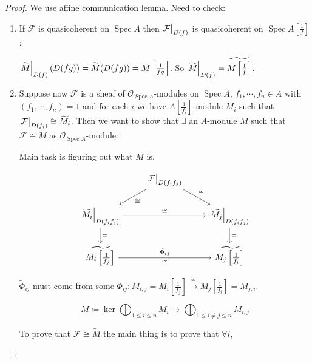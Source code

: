 \documentclass{article}
\theoremstyle{definition}
\begin{document}
    \begin{proof}
        We use affine communication lemma. Need to check:

        \begin{enumerate}[label=\arabic*)]
            \item If \(\mathcal{F}\) is quasicoherent on \(\operatorname{Spec} A\) then \(\eval{\mathcal{F}}_{D(f)}\) is quasicoherent on \(\operatorname{Spec} A\left[ \frac{1}{f} \right]\):
            
            \(\eval{\widetilde{M}}_{D(f)} (D(fg)) = \widetilde{M} (D(fg)) = M \left[ \frac{1}{fg} \right]\). So \(\eval{\widetilde{M}}_{D(f)} = \widetilde{M \left[ \frac{1}{f} \right] }\).   

            \item Suppose now \(\mathcal{F}\) is a sheaf of \(\mathcal{O}_{\operatorname{Spec} A}\)-modules on \(\operatorname{Spec} A\), \(f_1, \cdots , f_n \in A\) with \((f_1, \cdots , f_n) = 1\) and for each \(i\) we have \(A \left[ \frac{1}{f_i} \right] \)-module \(M_i\) such that \(\eval{\mathcal{F}}_{D(f_i)} \cong \widetilde{M}_i\). Then we want to show that \(\exists\) an \(A\)-module \(M\) such that \(\mathcal{F} \cong \widetilde{M}\) as \(\mathcal{O}_{\operatorname{Spec} A}\)-module:
            
            Main task is figuring out what \(M\) is.

            \[
                \begin{tikzcd}
                    & \eval{\mathcal{F}}_{D(f_i f_j)} \ar[ld, "\cong"] \ar[rd,"\cong"] \\ \eval{\widetilde{M}_i}_{D(f_i f_j)} \ar[rr,"\cong"] \ar[d,"="] & & \eval{\widetilde{M}_j}_{D(f_i f_j)} \ar[d,"="] \\
                    \widetilde{M_i \left[ \frac{1}{f_j} \right]} \ar[rr, "\widetilde{\Phi}_{ij}", "\cong"'] & & \widetilde{M_j \left[ \frac{1}{f_i} \right]} 
                \end{tikzcd}
            \]

            \(\widetilde{\Phi}_{ij}\) must come from some \(\Phi_{ij}: M_{i,j} = M_i \left[ \frac{1}{f_j} \right] \xrightarrow{\cong} M_j \left[ \frac{1}{f_i} \right] = M_{j,i}\). 
            
            \[
                M \coloneqq \ker \bigoplus_{1 \leq i \leq n} M_i \to \bigoplus_{1 \leq i \neq j \leq n} M_{i,j} 
            \]

            To prove that \(\mathcal{F} \cong \widetilde{M} \) the main thing is to prove that \(\forall i\),


\end{enumerate}
\end{proof}
\end{document}
